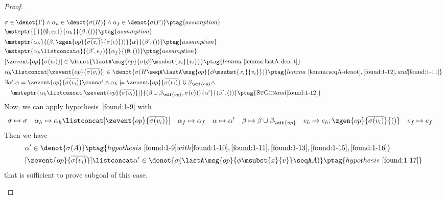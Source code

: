 \begin{proof}
\begin{enumerate}[label=Case]
{\begin{alignat}{2}
&\sigma \in \denot{\Gamma} \land \alpha_h \in \denot{\sigma(H)} \land  \alpha_f \in \denot{\sigma(F)} \ptag{assumption} \label{found:1-10}
\\& \msteptr{[]}{(\emptyset, e_h)}{\alpha_h}{(\beta, ())} \ptag{assumption} \label{found:1-11}
\\& \msteptr{\alpha_h}{(\beta, \zgen{op}{\overline{\sigma(v_i)}}{\sigma(e)}))}{\alpha}{(\beta', ())} \ptag{assumption} \label{found:1-12}
\\& \msteptr{\alpha_h \listconcat \alpha }{(\beta', e_f)}{\alpha_f}{(\emptyset, ())} \ptag{assumption} \label{found:1-13}
\\& [\zevent{op}{\overline{\sigma(v_i)}}] \in \denot{\lastA\msg{op}{\sigma(\phi)\msubst{x_i}{v_i}}} \ptag{lemma~\ref{lemma:lastA-denot}} \label{found:1-14}
\\& \alpha_h \listconcat [\zevent{op}{\overline{\sigma(v_i)}}] \in \denot{\sigma(H \seqA \lastA\msg{op}{\phi\msubst{x_i}{v_i}})} \ptag{lemma~\ref{lemma:seqA-denot}, \ref{found:1-12}, and \ref{found:1-11}} \label{found:1-15}
\\& \exists \alpha'. \alpha = \zevent{op}{\overline{\sigma(v_i)}} \cons \alpha' \land
\alpha_h \models \zevent{op}{\overline{\sigma(v_i)}} \Downarrow \beta_{\eff{op}} \land \notag
\\&\quad\msteptr{\alpha_h \listconcat [\zevent{op}{\overline{\sigma(v_i)}}]}{(\beta \cup \beta_{\eff{op}}, \sigma(e))}{\alpha'}{(\beta', ())} \ptag{\textsc{StGen} and \ref{found:1-12}} \label{found:1-16}
\end{alignat}}\noindent
Now, we can apply hypothesis~\ref{found:1-9} with
{\footnotesize\begin{align*}
    &\sigma \mapsto \sigma \quad \alpha_h \mapsto \alpha_h \listconcat [\zevent{op}{\overline{\sigma(v_i)}}] \quad \alpha_f \mapsto \alpha_f \quad \alpha \mapsto \alpha' \quad \beta \mapsto \beta \cup \beta_{\eff{op}} \quad
    e_h \mapsto e_h; \zgen{op}{\overline{\sigma(v_i)}}{()} \quad e_f \mapsto e_f
\end{align*}}\noindent
Then we have
{\footnotesize\begin{alignat}{2}
&\alpha' \in\denot{\sigma(A)} \ptag{hypothesis~\ref{found:1-9} with \ref{found:1-10}, \ref{found:1-11}, \ref{found:1-13}, \ref{found:1-15}, \ref{found:1-16}} \label{found:1-17}
\\&[\zevent{op}{\overline{\sigma(v_i)}}] \listconcat \alpha' \in\denot{\sigma(\lastA\msg{op}{\phi\msubst{x}{v}} \seqA A)}\ptag{hypothesis~\ref{found:1-17}} \label{found:1-18}
\end{alignat}}\noindent
that is sufficient to prove subgoal of this case.


\end{enumerate}
\end{proof}
